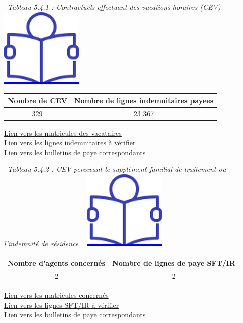 ~\emph{Tableau 5.4.1 : Contractuels effectuant des vacations horaires
(CEV)} ~
\href{../Docs/Notices/fiche_CEV_horaires.odt}{\includegraphics{icones/Notice.png}}

\begin{longtable}[]{@{}cc@{}}
\toprule
Nombre de CEV & Nombre de lignes indemnitaires payees\tabularnewline
\midrule
\endhead
329 & 23 367\tabularnewline
\bottomrule
\end{longtable}

\href{../Bases/Reglementation/matricules.contractuels.et.vacations.csv}{Lien
vers les matricules des vacataires}\\
\href{../Bases/Reglementation/RI.et.vacations.csv}{Lien vers les lignes
indemnitaires à vérifier}\\
\href{../Bases/Reglementation/Paie_vac_contr.csv}{Lien vers les bulletins
de paye correspondants}

~\emph{Tableau 5.4.2 : CEV percevant le supplément familial de
traitement ou l'indemnité de résidence} ~
\href{../Docs/Notices/fiche_CEV_SFT.odt}{\includegraphics{icones/Notice.png}}

\begin{longtable}[]{@{}cc@{}}
\toprule
Nombre d'agents concernés & Nombre de lignes de paye
SFT/IR\tabularnewline
\midrule
\endhead
2 & 2\tabularnewline
\bottomrule
\end{longtable}

\href{../Bases/Reglementation/matricules.SFT_IR.et.vacations.csv}{Lien vers
les matricules concernés}\\
\href{../Bases/Reglementation/SFT_IR.et.vacations.csv}{Lien vers les lignes
SFT/IR à vérifier}\\
\href{../Bases/Reglementation/Paie_vac_sft_ir.csv}{Lien vers les bulletins
de paye correspondants}

